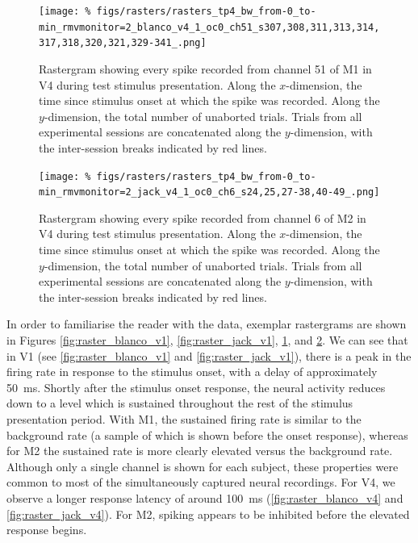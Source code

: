 \begin{figure}[p]
    \centering
    \texttt{[image: \%
figs/rasters/rasters\_tp4\_bw\_from-0\_to-min\_rmvmonitor=2\_blanco\_v4\_1\_oc0\_ch51\_s307,308,311,313,314,317,318,320,321,329-341\_.png]}
    \caption{Rastergram showing every spike recorded from channel \num{51} of \ac{M1} in \ac{V4} during test stimulus presentation.
    Along the $x$-dimension, the time since stimulus onset at which the spike was recorded.
    Along the $y$-dimension, the total number of unaborted trials.
    Trials from all experimental sessions are concatenated along the $y$-dimension, with the inter-session breaks indicated by red lines.
}
    \label{fig:raster_blanco_v4}
\end{figure}


\begin{figure}[p]
    \centering
    \texttt{[image: \%
figs/rasters/rasters\_tp4\_bw\_from-0\_to-min\_rmvmonitor=2\_jack\_v4\_1\_oc0\_ch6\_s24,25,27-38,40-49\_.png]}
    \caption{Rastergram showing every spike recorded from channel \num{6} of \ac{M2} in \ac{V4} during test stimulus presentation.
    Along the $x$-dimension, the time since stimulus onset at which the spike was recorded.
    Along the $y$-dimension, the total number of unaborted trials.
    Trials from all experimental sessions are concatenated along the $y$-dimension, with the inter-session breaks indicated by red lines.
}
    \label{fig:raster_jack_v4}
\end{figure}


In order to familiarise the reader with the data, exemplar rastergrams are shown in Figures \ref{fig:raster_blanco_v1}, \ref{fig:raster_jack_v1}, \ref{fig:raster_blanco_v4}, and \ref{fig:raster_jack_v4}.
We can see that in \ac{V1} (see \autoref{fig:raster_blanco_v1} and \autoref{fig:raster_jack_v1}), there is a peak in the firing rate in response to the stimulus onset, with a delay of approximately \SI{50}{\milli\second}.
Shortly after the stimulus onset response, the neural activity reduces down to a level which is sustained throughout the rest of the stimulus presentation period.
With \ac{M1}, the sustained firing rate is similar to the background rate (a sample of which is shown before the onset response), whereas for \ac{M2} the sustained rate is more clearly elevated versus the background rate.
Although only a single channel is shown for each subject, these properties were common to most of the simultaneously captured neural recordings.
For \ac{V4}, we observe a longer response latency of around \SI{100}{\milli\second} (\autoref{fig:raster_blanco_v4} and \autoref{fig:raster_jack_v4}).
For \ac{M2}, spiking appears to be inhibited before the elevated response begins.

